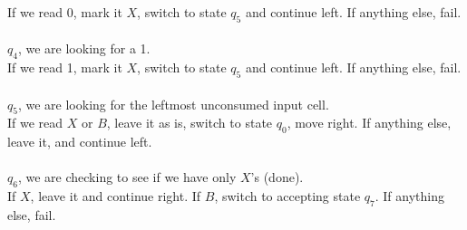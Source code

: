 \documentclass[a4paper]{article}
\begin{document}
\begin{enumerate}
\begin{enumerate}[1.]
If we read 0, mark it $X$, switch to state $q_5$ and continue left. If anything else, fail. \\
\\
$q_4$, we are looking for a 1. 
\\
If we read 1, mark it $X$, switch to state $q_5$ and continue left. If anything else, fail. \\
\\
$q_5$, we are looking for the leftmost unconsumed input cell. 
\\
If we read $X$ or $B$, leave it as is, switch to state $q_0$, move right. If anything else, leave it, and continue left. \\
\\
$q_6$, we are checking to see if we have only $X$'s (done). 
\\
If $X$, leave it and continue right. If $B$, switch to accepting state $q_7$. If anything else, fail. \\
\\


\end{enumerate}
\end{enumerate}
\end{document}
